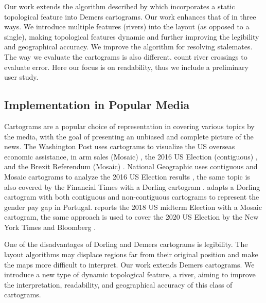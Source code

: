 Our work extends the algorithm described by  which incorporates a static topological feature into Demers cartograms. Our work enhances that of \citeauthor{tong2018cartograms} in three ways. We introduce multiple features (rivers) into the layout (as opposed to a single), making topological features dynamic and further improving the legibility and geographical accuracy. We improve the algorithm for resolving stalemates.  The way we evaluate the cartograms is also different. \citeauthor{tong2018cartograms} count river crossings to evaluate error. Here our focus is on readability, thus we include a preliminary user study.

\subsection{Implementation in Popular Media}

Cartograms are a popular choice of representation in covering various topics by the media, with the goal of presenting an unbiased and complete picture of the news. The Washington Post uses cartograms to visualize the US overseas economic assistance, in arm sales (Mosaic) \cite{bearak2016Everything}, the 2016 US Election (contiguous) \cite{gamio2016Election}, and the Brexit Referendum (Mosaic) \cite{taylor2016What}. National Geographic uses contiguous and Mosaic cartograms to analyze the 2016 US Election results \cite{miller2016Election}, the same topic is also covered by the Financial Times with a Dorling cartogram \cite{stabe2016Search}.  adapts a Dorling cartogram with both contiguous and non-contiguous cartograms to represent the gender pay gap in Portugal.  reports the 2018 US midterm Election with a Mosaic cartogram, the same approach is used to cover the 2020 US Election by the New York Times \cite{thelearningnetwork2020What} and Bloomberg \cite{mccartney20202020}.




One of the disadvantages of Dorling and Demers cartograms is legibility. The layout algorithms may displace regions far from their original position and make the maps more difficult to interpret. Our work extends Demers cartograms. We introduce a new type of dynamic topological feature, a river, aiming to improve the interpretation, readability, and geographical accuracy of this class of cartograms.